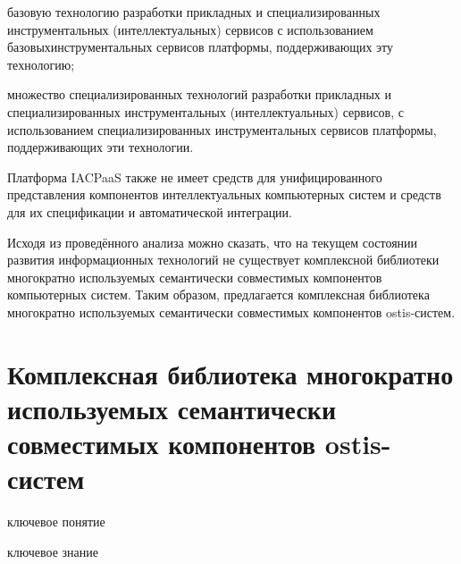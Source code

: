 \begin{textitemize}
	\item базовую технологию разработки прикладных и специализированных инструментальных (интеллектуальных) сервисов с использованием базовыхинструментальных сервисов платформы, поддерживающих эту технологию;
	\item множество специализированных технологий разработки прикладных и специализированных инструментальных (интеллектуальных) сервисов, с использованием специализированных инструментальных сервисов платформы, поддерживающих эти технологии.
\end{textitemize}

Платформа IACPaaS также не имеет средств для унифицированного представления компонентов интеллектуальных компьютерных систем и средств для их спецификации и автоматической интеграции.

Исходя из проведённого анализа можно сказать, что на текущем состоянии развития информационных технологий не существует комплексной библиотеки многократно используемых семантически совместимых компонентов компьютерных систем. Таким образом, предлагается комплексная библиотека многократно используемых семантически совместимых компонентов ostis-систем.

\section{Комплексная библиотека многократно используемых семантически совместимых компонентов ostis-систем}
\label{ostis_library_section}

\begin{SCn}
\begin{scnrelfromlist}{ключевое понятие}
\end{scnrelfromlist}
\end{SCn}

\bigskip

\begin{SCn}
\begin{scnrelfromlist}{ключевое знание}
\end{scnrelfromlist}
\end{SCn}

